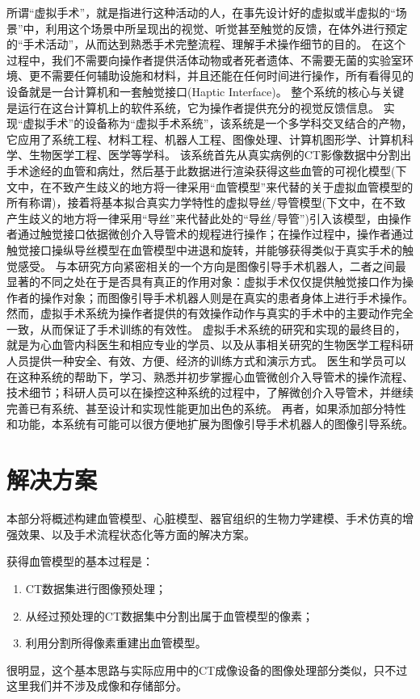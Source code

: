 所谓“虚拟手术”，就是指进行这种活动的人，在事先设计好的虚拟或半虚拟的“场景”中，利用这个场景中所呈现出的视觉、听觉甚至触觉的反馈，在体外进行预定的“手术活动”，从而达到熟悉手术完整流程、理解手术操作细节的目的。
在这个过程中，我们不需要向操作者提供活体动物或者死者遗体、不需要无菌的实验室环境、更不需要任何辅助设施和材料，并且还能在任何时间进行操作，所有看得见的设备就是一台计算机和一套触觉接口(Haptic Interface)。%
整个系统的核心与关键是运行在这台计算机上的软件系统，它为操作者提供充分的视觉反馈信息。
实现“虚拟手术”的设备称为“虚拟手术系统”，该系统是一个多学科交叉结合的产物，它应用了系统工程、材料工程、机器人工程、图像处理、计算机图形学、计算机科学、生物医学工程、医学等学科。
该系统首先从真实病例的CT影像数据中分割出手术途经的血管和病灶，然后基于此数据进行渲染获得这些血管的可视化模型(下文中，在不致产生歧义的地方将一律采用“血管模型”来代替的关于虚拟血管模型的所有称谓)，接着将基本拟合真实力学特性的虚拟导丝/导管模型(下文中，在不致产生歧义的地方将一律采用“导丝”来代替此处的“导丝/导管”)引入该模型，由操作者通过触觉接口依据微创介入导管术的规程进行操作；在操作过程中，操作者通过触觉接口操纵导丝模型在血管模型中进退和旋转，并能够获得类似于真实手术的触觉感受。
与本研究方向紧密相关的一个方向是图像引导手术机器人，二者之间最显著的不同之处在于是否具有真正的作用对象：虚拟手术仅仅提供触觉接口作为操作者的操作对象；而图像引导手术机器人则是在真实的患者身体上进行手术操作。然而，虚拟手术系统为操作者提供的有效操作动作与真实的手术中的主要动作完全一致，从而保证了手术训练的有效性。
虚拟手术系统的研究和实现的最终目的，就是为心血管内科医生和相应专业的学员、以及从事相关研究的生物医学工程科研人员提供一种安全、有效、方便、经济的训练方式和演示方式。
医生和学员可以在这种系统的帮助下，学习、熟悉并初步掌握心血管微创介入导管术的操作流程、技术细节；科研人员可以在操控这种系统的过程中，了解微创介入导管术，并继续完善已有系统、甚至设计和实现性能更加出色的系统。
再者，如果添加部分特性和功能，本系统有可能可以很方便地扩展为图像引导手术机器人的图像引导系统。

\section{解决方案}
\label{sec1-3}

本部分将概述构建血管模型、心脏模型、器官组织的生物力学建模、手术仿真的增强效果、以及手术流程状态化等方面的解决方案。

获得血管模型的基本过程是\cite{Preim2008Review}：
\begin{enumerate}
  \item CT数据集进行图像预处理；
  \item 从经过预处理的CT数据集中分割出属于血管模型的像素；
  \item 利用分割所得像素重建出血管模型。
\end{enumerate}
很明显，这个基本思路与实际应用中的CT成像设备的图像处理部分类似，只不过这里我们并不涉及成像和存储部分。

